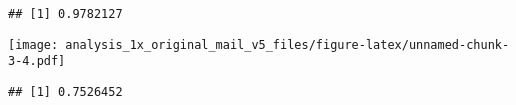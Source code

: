 \documentclass[
]{article}
\newenvironment{Shaded}{\begin{snugshade}}{\end{snugshade}}
\newcommand{\DataTypeTok}[1]{\textcolor[rgb]{0.13,0.29,0.53}{#1}}
\newcommand{\KeywordTok}[1]{\textcolor[rgb]{0.13,0.29,0.53}{\textbf{#1}}}
\newcommand{\NormalTok}[1]{#1}
\newcommand{\OperatorTok}[1]{\textcolor[rgb]{0.81,0.36,0.00}{\textbf{#1}}}
\newcommand{\StringTok}[1]{\textcolor[rgb]{0.31,0.60,0.02}{#1}}
\begin{document}
\begin{verbatim}
## [1] 0.9782127
\end{verbatim}

\begin{Shaded}
\end{Shaded}

\texttt{[image: analysis\_1x\_original\_mail\_v5\_files/figure-latex/unnamed-chunk-3-4.pdf]}

\begin{Shaded}
\end{Shaded}

\begin{verbatim}
## [1] 0.7526452
\end{verbatim}
\end{document}

